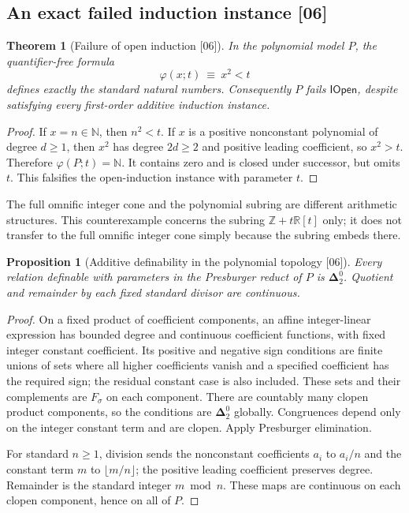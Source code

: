 \documentclass[11pt]{article}
\numberwithin{equation}{section}
\newtheorem{theorem}{Theorem}[section]
\newtheorem{proposition}[proposition]{Proposition}
\theoremstyle{definition}
\theoremstyle{remark}
\newcommand{\N}{\mathbb N}
\newcommand{\Z}{\mathbb Z}
\newcommand{\R}{\mathbb R}
\newcommand{\IOpen}{\mathsf{IOpen}}
\newcommand{\src}[1]{\textup{\textsf{\small[#1]}}}
\begin{document}
\subsection{An exact failed induction instance \src{06}}

\begin{theorem}[Failure of open induction \src{06}]
\label{pma:cp:thm:openfailure}
In the polynomial model $P$, the quantifier-free formula
\[
 \varphi(x;t)\ \equiv\ x^2<t
\]
defines exactly the standard natural numbers. Consequently $P$ fails
$\IOpen$, despite satisfying every first-order additive induction
instance.
\end{theorem}

\begin{proof}
If $x=n\in\N$, then $n^2<t$. If $x$ is a positive nonconstant
polynomial of degree $d\geq1$, then $x^2$ has degree $2d\geq2$ and
positive leading coefficient, so $x^2>t$. Therefore
$\varphi(P;t)=\N$. It contains zero and is closed under successor,
but omits $t$. This falsifies the open-induction instance with
parameter $t$.
\end{proof}

The full omnific integer cone and the polynomial subring are different
arithmetic structures. This counterexample concerns the subring
$\Z+t\R[t]$ only; it does not transfer to the full omnific integer
cone simply because the subring embeds there.

\begin{proposition}[Additive definability in the polynomial topology \src{06}]
Every relation definable with parameters in the Presburger reduct of
$P$ is $\boldsymbol\Delta^0_2$. Quotient and remainder by each fixed
standard divisor are continuous.
\end{proposition}

\begin{proof}
On a fixed product of coefficient components, an affine
integer-linear expression has bounded degree and continuous
coefficient functions, with fixed integer constant coefficient.
Its positive and negative sign conditions are finite unions of sets
where all higher coefficients vanish and a specified coefficient has
the required sign; the residual constant case is also included.
These sets and their complements are $F_\sigma$ on each component.
There are countably many clopen product components, so the conditions
are $\boldsymbol\Delta^0_2$ globally. Congruences depend only on the
integer constant term and are clopen. Apply Presburger elimination.

For standard $n\geq1$, division sends the nonconstant coefficients
$a_i$ to $a_i/n$ and the constant term $m$ to $\lfloor m/n\rfloor$;
the positive leading coefficient preserves degree. Remainder is the
standard integer $m\bmod n$. These maps are continuous on each clopen
component, hence on all of $P$.
\end{proof}
\end{document}
